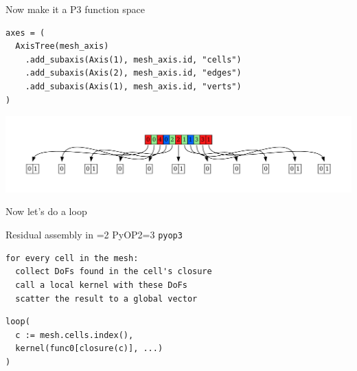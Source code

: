 \documentclass[aspectratio=169]{beamer}
\def\pyop#1{\ifnum#1=2 {PyOP2}\else \ifnum#1=3 {\texttt{pyop3}}\fi \fi}
\begin{document}
\begin{frame}[fragile]{Now make it a P3 function space}
  \noindent
  \begin{minipage}{.4\textwidth}
    \begin{tikzpicture}[scale=1.5]
      
    \end{tikzpicture}
  \end{minipage}%
  \begin{minipage}{.55\textwidth}
    \begin{tcolorbox}
      \begin{verbatim}
axes = (
  AxisTree(mesh_axis)
    .add_subaxis(Axis(1), mesh_axis.id, "cells")
    .add_subaxis(Axis(2), mesh_axis.id, "edges")
    .add_subaxis(Axis(1), mesh_axis.id, "verts")
)
      \end{verbatim}
    \end{tcolorbox}
  \end{minipage}

  \pause
  \vspace{-2em}

  \begin{center}
    \includegraphics[width=\textwidth]{scripts/two_cell_P3_layout.gv.pdf}
  \end{center}
\end{frame}

\begin{frame}{Now let's do a loop}
  \begin{tikzpicture}
    
  \end{tikzpicture}
\end{frame}

\begin{frame}[fragile]{Residual assembly in \pyop3}
  \begin{tcolorbox}
    \begin{verbatim}
for every cell in the mesh:
  collect DoFs found in the cell's closure
  call a local kernel with these DoFs
  scatter the result to a global vector
    \end{verbatim}
  \end{tcolorbox}

  \pause

  \begin{tcolorbox}
    \begin{verbatim}
loop(
  c := mesh.cells.index(),
  kernel(func0[closure(c)], ...)
)
    \end{verbatim}
  \end{tcolorbox}
\end{frame}
\end{document}
